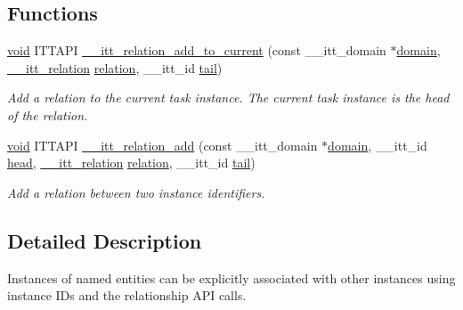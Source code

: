 \subsection*{Functions}
\begin{DoxyCompactItemize}
\item 
\hyperlink{ittnotify__static_8h_af941d56e55e3c5465135b60c4d6343ed}{void} I\-T\-T\-A\-P\-I \hyperlink{group__relations_ga74908fac2ada0681fe88bf47b30ecf86}{\-\_\-\-\_\-itt\-\_\-relation\-\_\-add\-\_\-to\-\_\-current} (const \-\_\-\-\_\-itt\-\_\-domain $\ast$\hyperlink{ittnotify__static_8h_ae4bc3459cfd348603d57d87ede15591b}{domain}, \hyperlink{group__relations_ga2f588e0d778ac0cca7cc0b64cfb1bdca}{\-\_\-\-\_\-itt\-\_\-relation} \hyperlink{ittnotify__static_8h_ae967281c13f1d244e0ac507299a2cfe9}{relation}, \-\_\-\-\_\-itt\-\_\-id \hyperlink{ittnotify__static_8h_a7205a2ef1da3b41743f40e66ffb8a1be}{tail})
\begin{DoxyCompactList}\small\item\em Add a relation to the current task instance. The current task instance is the head of the relation. \end{DoxyCompactList}\item 
\hyperlink{ittnotify__static_8h_af941d56e55e3c5465135b60c4d6343ed}{void} I\-T\-T\-A\-P\-I \hyperlink{group__relations_gaa92212e121a2b80f71af099fc492b136}{\-\_\-\-\_\-itt\-\_\-relation\-\_\-add} (const \-\_\-\-\_\-itt\-\_\-domain $\ast$\hyperlink{ittnotify__static_8h_ae4bc3459cfd348603d57d87ede15591b}{domain}, \-\_\-\-\_\-itt\-\_\-id \hyperlink{ittnotify__static_8h_ac73017ec329810f133ecdb16b66e5208}{head}, \hyperlink{group__relations_ga2f588e0d778ac0cca7cc0b64cfb1bdca}{\-\_\-\-\_\-itt\-\_\-relation} \hyperlink{ittnotify__static_8h_ae967281c13f1d244e0ac507299a2cfe9}{relation}, \-\_\-\-\_\-itt\-\_\-id \hyperlink{ittnotify__static_8h_a7205a2ef1da3b41743f40e66ffb8a1be}{tail})
\begin{DoxyCompactList}\small\item\em Add a relation between two instance identifiers. \end{DoxyCompactList}\end{DoxyCompactItemize}


\subsection{Detailed Description}
Instances of named entities can be explicitly associated with other instances using instance I\-Ds and the relationship A\-P\-I calls. 

